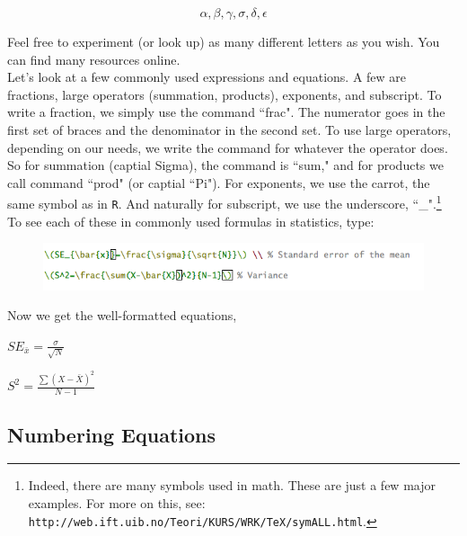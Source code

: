 \documentclass[11pt]{article}
\begin{document}
\[\alpha, \beta, \gamma, \sigma, \delta, \epsilon\]

Feel free to experiment (or look up) as many different letters as you wish. You can find many resources online. \\

Let's look at a few commonly used expressions and equations. A few are fractions, large operators (summation, products), exponents, and subscript. To write a fraction, we simply use the command ``frac". The numerator goes in the first set of braces and the denominator in the second set. To use large operators, depending on our needs, we write the command for whatever the operator does. So for summation (captial Sigma), the command is ``sum," and for products we call command ``prod" (or captial ``Pi"). For exponents, we use the carrot, the same symbol as in \texttt{R}. And naturally for subscript, we use the underscore, ``\_".\footnote{Indeed, there are many symbols used in math. These are just a few major examples. For more on this, see: \texttt{http://web.ift.uib.no/Teori/KURS/WRK/TeX/symALL.html}.} \\

To see each of these in commonly used formulas in statistics, type:

\begin{figure}[!h]
	\includegraphics[scale=.5]{EQS} \\
	\centering
\end{figure}

Now we get the well-formatted equations, \\

\begin{center}

\(SE_{\bar{x}}=\frac{\sigma}{\sqrt{N}}\) \\ %

\vspace{.5cm}

\(S^2=\frac{\sum(X-\bar{X})^2}{N-1}\) \\ %

\end{center}

\subsection{Numbering Equations}
\end{document}
